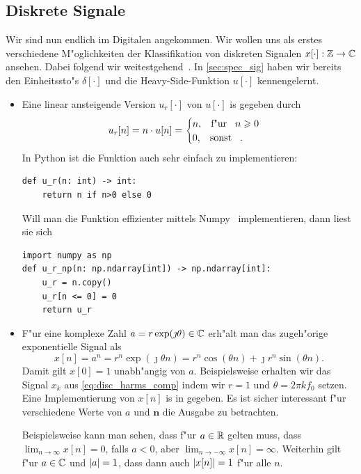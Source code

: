 \subsection{Diskrete Signale}

Wir sind nun endlich im Digitalen angekommen. 
Wir wollen uns als erstes verschiedene M"oglichkeiten der Klassifikation von diskreten Signalen $x[\cdot] : \mathbb{Z} \rightarrow \mathbb{C}$ ansehen.
Dabei folgend wir weitestgehend~\cite[Kap.~2.1]{proakis2013}.
In \cref{sec:spec_sig} haben wir bereits den Einheitssto"s $\delta[\cdot]$ und die Heavy-Side-Funktion $u[\cdot]$ kennengelernt.

\begin{itemize}
    \item Eine linear ansteigende Version $u_r[\cdot]$ von $u[\cdot]$ is gegeben durch
    \[
        u_r[n] = n \cdot u[n] = \begin{cases}
            n, {\hspace{3mm} \text{f"ur} \hspace{3mm}} n \geqslant 0 \\
            0, {\hspace{3mm} \text{sonst} \hspace{3mm}}.
        \end{cases}
    \]
    In Python ist die Funktion auch sehr einfach zu implementieren:
\begin{verbatim}
def u_r(n: int) -> int:
    return n if n>0 else 0
\end{verbatim}
Will man die Funktion effizienter mittels Numpy~\cite{numpy} implementieren, dann liest sie sich
\begin{verbatim}
import numpy as np
def u_r_np(n: np.ndarray[int]) -> np.ndarray[int]:
    u_r = n.copy()
    u_r[n <= 0] = 0
    return u_r
\end{verbatim}
\item F"ur eine komplexe Zahl $a = r \exp(\jmath \theta) \in \mathbb{C}$ erh"alt man das zugeh"orige exponentielle Signal als
\[
    x[n] 
        = a ^ n 
        = r^n \exp(\jmath \theta n) 
        = r^n \cos(\theta n) + \jmath r^n \sin(\theta n).
\]
Damit gilt $x[0] = 1$ unabh"angig von $a$.
Beispielsweise erhalten wir das Signal $x_k$ aus \eqref{eq:disc_harms_comp} indem wir $r=1$ und $\theta = 2 \pi k f_0$ setzen.
Eine Implementierung von $x[n]$ is in  gegeben.
Es ist sicher interessant f"ur verschiedene Werte von $a$ und $\bm n$ die Ausgabe zu betrachten.

Beispielsweise kann man sehen, dass f"ur $a \in \mathbb{R}$ gelten muss, dass $\lim_{n \rightarrow \infty} x[n] = 0$, falls $a < 0$, aber $\lim_{n \rightarrow -\infty} x[n] = \infty$.
Weiterhin gilt f"ur $a \in \mathbb{C}$ und ${\left| a \right|} = 1$, dass dann auch ${\left| x[n] \right|} = 1$ f"ur alle $n$.
\end{itemize}
